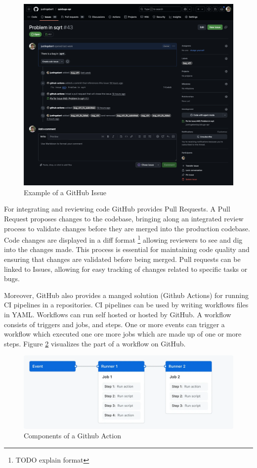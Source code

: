 \begin{figure}[H]
    \centering
    \includegraphics[width=1\textwidth]{images/github/github_issue.png}
    \caption{Example of a GitHub Issue}
    \label{fig:gh-issue}
\end{figure}

For integrating and reviewing code GitHub provides Pull Requests. A Pull Request proposes changes to the codebase, bringing along an integrated review process to validate changes before they are merged into the production codebase. Code changes are displayed in a diff format \footnote{TODO explain format} allowing reviewers to see and dig into the changes made. This process is essential for maintaining code quality and ensuring that changes are validated before being merged. Pull requests can be linked to Issues, allowing for easy tracking of changes related to specific tasks or bugs. \cite{PullRequests}

Moreover, GitHub also provides a manged solution (Github Actions) for running CI pipelines in a repositories. CI pipelines can be used by writing workflows files in YAML. Workflows can run self hosted or hosted by GitHub. A workflow consists of triggers and jobs, and steps. One or more events can trigger a workflow which executed one ore more jobs which are made up of one or more steps. \cite{UnderstandingGitHubActions} Figure \ref{fig:gh-workflow} visualizes the part of a workflow on GitHub. 

\begin{figure}[H]
    \centering
    \includegraphics[width=1\textwidth]{images/overview-actions-simple.png}
    \caption{Components of a Github Action}
    \label{fig:gh-workflow}
\end{figure}

